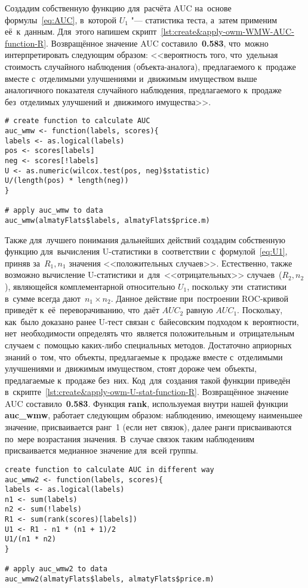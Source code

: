 \documentclass[]{scrreprt}
\begin{document}
Создадим собственную функцию для~расчёта AUC на~основе формулы~\ref{eq:AUC}, в~которой $U_{1}$ "--- статистика теста, а~затем применим её~к~данным. Для~этого напишем скрипт~\ref{lst:create&apply-owm-WMW-AUC-function-R}. Возвращённое значение AUC составило~\textbf{0.583}, что~можно интерпретировать следующим образом: <<вероятность того, что~удельная стоимость случайного наблюдения (объекта-аналога), предлагаемого к~продаже вместе с~отделимыми улучшениями и~движимым имуществом выше аналогичного показателя случайного наблюдения, предлагаемого к~продаже без~отделимых улучшений и~движимого имущества>>.
%
\begin{lstlisting}[float, caption = Создание собственной функции для~расчёта AUC и~её~применение к~данным рынка Алматы, firstnumber=1, label= lst:create&apply-owm-WMW-AUC-function-R]
# create function to calculate AUC
auc_wmw <- function(labels, scores){
labels <- as.logical(labels)
pos <- scores[labels]
neg <- scores[!labels]
U <- as.numeric(wilcox.test(pos, neg)$statistic)
U/(length(pos) * length(neg))
}

# apply auc_wmw to data
auc_wmw(almatyFlats$labels, almatyFlats$price.m)
\end{lstlisting}
%

Также для~лучшего понимания дальнейших действий создадим собственную функцию для~вычисления U-статистики в~соответствии с~формулой~\ref{eq:U1}, приняв за~$R_{1}, n_{1}$ значения <<положительных случаев>>. Естественно, также возможно вычисление U-статистики и~для~<<отрицательных>> случаев~($R_{2}, n_{2}$), являющейся комплементарной относительно $U_{1}$, поскольку эти~статистики в~сумме всегда дают~$n_{1} \times n_{2}$. Данное действие при~построении ROC-кривой приведёт к~её~переворачиванию, что~даёт $AUC_{2}$ равную $AUC_{1}$. Поскольку, как~было доказано ранее U-тест связан с~байесовским подходом к~вероятности, нет~необходимости определять что~является положительным и~отрицательным случаем с~помощью каких-либо специальных методов. Достаточно априорных знаний о~том, что~объекты, предлагаемые к~продаже вместе с~отделимыми улучшениями и~движимым имуществом, стоят дороже чем~объекты, предлагаемые к~продаже без~них. Код~для~создания такой функции приведён в~скрипте~\ref{lst:create&apply-owm-U-stat-function-R}. Возвращённое значение AUC составило~\textbf{0.583}. Функция \textbf{rank}, используемая внутри нашей функции \textbf{auc\_wmw}, работает следующим образом: наблюдению, имеющему наименьшее значение, присваивается ранг~1 (если нет~связок), далее ранги присваиваются по~мере возрастания значения. В~случае связок таким наблюдениям присваивается медианное значение для~всей группы.
%
\begin{lstlisting}[float, caption = Создание собственной функции для~вычисления U-статистики и~её~применение к~данным рынка Алматы, firstnumber=1, label= lst:create&apply-owm-U-stat-function-R]
 create function to calculate AUC in different way
auc_wmw2 <- function(labels, scores){
labels <- as.logical(labels)
n1 <- sum(labels)
n2 <- sum(!labels)
R1 <- sum(rank(scores)[labels])
U1 <- R1 - n1 * (n1 + 1)/2
U1/(n1 * n2)
}

# apply auc_wmw2 to data
auc_wmw2(almatyFlats$labels, almatyFlats$price.m)
\end{lstlisting}
%
\end{document}
